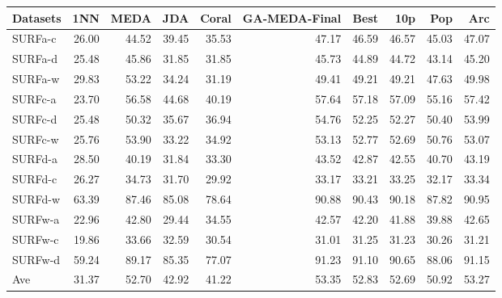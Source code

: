 \documentclass[a4paper]{article}
\begin{document}
    

\begin{tabular}{lrrrrrrrrr}
	\toprule
	Datasets &    1NN &   MEDA &    JDA &  Coral &  GA-MEDA-Final &   Best &    10p &    Pop &    Arc \\
	\midrule
	SURFa-c &  26.00 &  44.52 &  39.45 &  35.53 &          47.17 &  46.59 &  46.57 &  45.03 &  47.07 \\
	SURFa-d &  25.48 &  45.86 &  31.85 &  31.85 &          45.73 &  44.89 &  44.72 &  43.14 &  45.20 \\
	SURFa-w &  29.83 &  53.22 &  34.24 &  31.19 &          49.41 &  49.21 &  49.21 &  47.63 &  49.98 \\
	SURFc-a &  23.70 &  56.58 &  44.68 &  40.19 &          57.64 &  57.18 &  57.09 &  55.16 &  57.42 \\
	SURFc-d &  25.48 &  50.32 &  35.67 &  36.94 &          54.76 &  52.25 &  52.27 &  50.40 &  53.99 \\
	SURFc-w &  25.76 &  53.90 &  33.22 &  34.92 &          53.13 &  52.77 &  52.69 &  50.76 &  53.07 \\
	SURFd-a &  28.50 &  40.19 &  31.84 &  33.30 &          43.52 &  42.87 &  42.55 &  40.70 &  43.19 \\
	SURFd-c &  26.27 &  34.73 &  31.70 &  29.92 &          33.17 &  33.21 &  33.25 &  32.17 &  33.34 \\
	SURFd-w &  63.39 &  87.46 &  85.08 &  78.64 &          90.88 &  90.43 &  90.18 &  87.82 &  90.95 \\
	SURFw-a &  22.96 &  42.80 &  29.44 &  34.55 &          42.57 &  42.20 &  41.88 &  39.88 &  42.65 \\
	SURFw-c &  19.86 &  33.66 &  32.59 &  30.54 &          31.01 &  31.25 &  31.23 &  30.26 &  31.21 \\
	SURFw-d &  59.24 &  89.17 &  85.35 &  77.07 &          91.23 &  91.10 &  90.65 &  88.06 &  91.15 \\
	Ave &  31.37 &  52.70 &  42.92 &  41.22 &          53.35 &  52.83 &  52.69 &  50.92 &  53.27 \\
	\bottomrule
\end{tabular}
\end{document}
